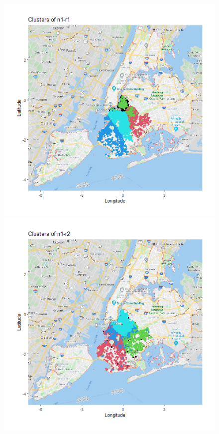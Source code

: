 \documentclass{FR16}
\begin{document}
\begin{itemize}
\begin{figure}[!htb]
   \begin{minipage}{0.33\textwidth}
     \centering
     \includegraphics[width=1\linewidth]{figures/clust-n1-r1.png} 
   \end{minipage}\hfill
   \begin{minipage}{0.33\textwidth}
     \centering
     \includegraphics[width=1\linewidth]{figures/clust-n1-r2.png}

\end{minipage}
\end{figure}
\end{itemize}
\end{document}

